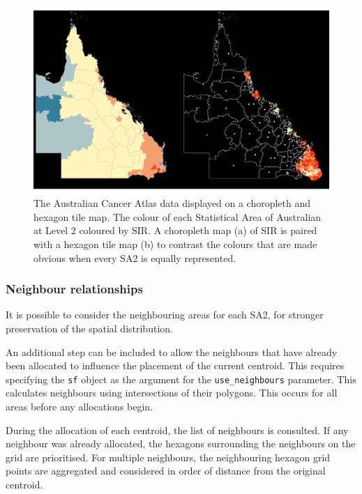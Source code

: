 \documentclass{monashthesis}
\begin{document}
\begin{figure}[H]
\centering
\includegraphics[width=14cm]{figures/03-algorithm/7SIR.pdf}
\caption{\label{fig:sir}The Australian Cancer Atlas data displayed on a choropleth and hexagon tile map. The colour of each Statistical Area of Australian at Level 2 coloured by SIR. A choropleth map (a) of SIR is paired with a hexagon tile map (b) to contrast the colours that are made obvious when every SA2 is equally represented.}
\end{figure}

\hypertarget{neighbour-relationships}{%
\subsubsection{Neighbour relationships}\label{neighbour-relationships}}

It is possible to consider the neighbouring areas for each SA2, for stronger preservation of the spatial distribution.

An additional step can be included to allow the neighbours that have already been allocated to influence the placement of the current centroid.
This requires specifying the \texttt{sf} object as the argument for the \texttt{use\_neighbours} parameter. This calculates neighbours using intersections of their polygons. This occurs for all areas before any allocations begin.

During the allocation of each centroid, the list of neighbours is consulted. If any neighbour was already allocated, the hexagons surrounding the neighbours on the grid are prioritised. For multiple neighbours, the neighbouring hexagon grid points are aggregated and considered in order of distance from the original centroid.
\end{document}
